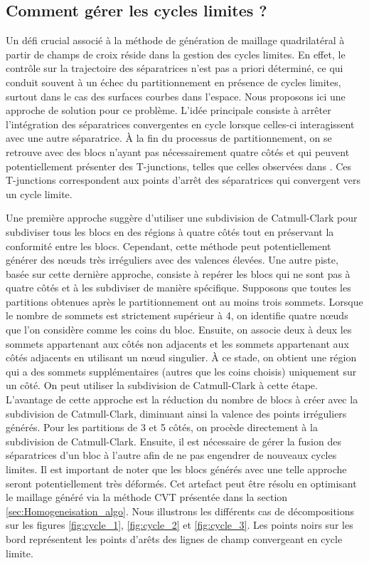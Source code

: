 \subsection*{Comment gérer les cycles limites ?}
Un défi crucial associé à la méthode de génération de maillage quadrilatéral à partir de champs de croix réside dans la gestion des cycles limites. En effet, le contrôle sur la trajectoire des séparatrices n'est pas a priori déterminé, ce qui conduit souvent à un échec du partitionnement en présence de cycles limites, surtout dans le cas des surfaces courbes dans l'espace. Nous proposons ici une approche de solution pour ce problème. L'idée principale consiste à arrêter l'intégration des séparatrices convergentes en cycle lorsque celles-ci interagissent avec une autre séparatrice. À la fin du processus de partitionnement, on se retrouve avec des blocs n'ayant pas nécessairement quatre côtés et qui peuvent potentiellement présenter des T-junctions, telles que celles observées dans \cite{viertel2019approach}. Ces T-junctions correspondent aux points d'arrêt des séparatrices qui convergent vers un cycle limite.

Une première approche suggère d'utiliser une subdivision de Catmull-Clark \cite{catmull1998recursively,kuth2023edge} pour subdiviser tous les blocs en des régions à quatre côtés tout en préservant la conformité entre les blocs. Cependant, cette méthode peut potentiellement générer des nœuds très irréguliers avec des valences élevées. Une autre piste, basée sur cette dernière approche, consiste à repérer les blocs qui ne sont pas à quatre côtés et à les subdiviser de manière spécifique. Supposons que toutes les partitions obtenues après le partitionnement ont au moins trois sommets. Lorsque le nombre de sommets est strictement supérieur à 4, on identifie quatre nœuds que l'on considère comme les coins du bloc. Ensuite, on associe deux à deux les sommets appartenant aux côtés non adjacents et les sommets appartenant aux côtés adjacents en utilisant un nœud singulier. À ce stade, on obtient une région qui a des sommets supplémentaires (autres que les coins choisis) uniquement sur un côté. On peut utiliser la subdivision de Catmull-Clark à cette étape. L'avantage de cette approche est la réduction du nombre de blocs à créer avec la subdivision de Catmull-Clark, diminuant ainsi la valence des points irréguliers générés. Pour les partitions de 3 et 5 côtés, on procède directement à la subdivision de Catmull-Clark. Ensuite, il est nécessaire de gérer la fusion des séparatrices d'un bloc à l'autre afin de ne pas engendrer de nouveaux cycles limites. Il est important de noter que les blocs générés avec une telle approche seront potentiellement très déformés. Cet artefact peut être résolu en optimisant le maillage généré via la méthode CVT présentée dans la section \ref{sec:Homogeneisation_algo}. Nous illustrons les différents cas de décompositions sur les figures \ref{fig:cycle_1}, \ref{fig:cycle_2} et \ref{fig:cycle_3}. Les points noirs sur les bord représentent les points d'arêts des lignes de champ convergeant en cycle limite.


